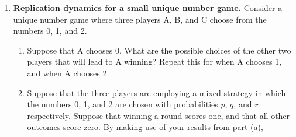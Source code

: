 \documentclass[12pt]{article}
\begin{document}
\begin{enumerate}
\begin{enumerate}
\begin{equation}
	  \right).
	  \label{eq:rps2}
	\end{equation}
	Modify your program from part (a) to solve the replicator dynamics for
	this payoff matrix. Try the following two initial conditions: (i) your
	equilibrium solution from part (a), and (ii)
	$(p_0,p_1,p_2)=(0.8,0.1,0.1)$. Comment on the results.
      \item \textbf{Extra credit.} Examine the case where a win scores one point and
	a loss loses two points.
    \end{enumerate}
  \item \textbf{Replication dynamics for a small unique number game.}
    Consider a unique number game where three players A, B, and C choose from
    the numbers 0, 1, and 2.
    \begin{enumerate}
      \item Suppose that A chooses 0. What are the possible choices of the
	other two players that will lead to A winning? Repeat this for
	when A chooses 1, and when A chooses 2.
      \item Suppose that the three players are employing a mixed strategy in
	which the numbers 0, 1, and 2 are chosen with probabilities $p$, $q$, and
	$r$ respectively. Suppose that winning a round scores one, and that all
	other outcomes score zero. By making use of your results from part (a),

\end{enumerate}
\end{enumerate}
\end{document}
